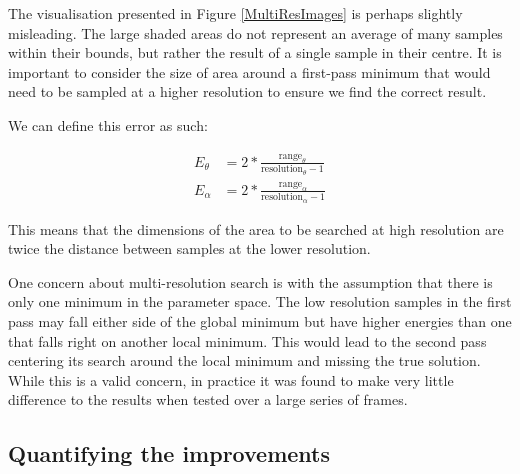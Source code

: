 The visualisation presented in Figure \ref{MultiResImages} is perhaps slightly misleading.
The large shaded areas do not represent an average of many samples within their bounds, but rather the result of a single sample in their centre.
It is important to consider the size of area around a first-pass minimum that would need to be sampled at a higher resolution to ensure we find the correct result.

We can define this error as such:

\begin{align}
	E_\theta &= 2 * \frac{\text{range}_\theta}{\text{resolution}_\theta - 1} \\
	E_\alpha &= 2 * \frac{\text{range}_\alpha}{\text{resolution}_\alpha - 1}
\end{align}

This means that the dimensions of the area to be searched at high resolution are twice the distance between samples at the lower resolution.

One concern about multi-resolution search is with the assumption that there is only one minimum in the parameter space.
The low resolution samples in the first pass may fall either side of the global minimum but have higher energies than one that falls right on another local minimum.
This would lead to the second pass centering its search around the local minimum and missing the true solution.
While this is a valid concern, in practice it was found to make very little difference to the results when tested over a large series of frames.

\subsection{Quantifying the improvements}
